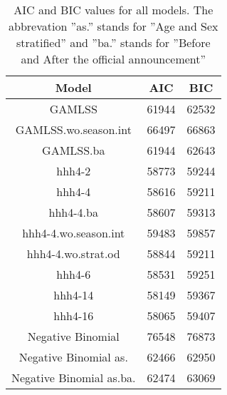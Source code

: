 \begin{table}[ht]
\centering
\begin{tabular}{ccc}
  \hline
Model & AIC & BIC \\ 
  \hline
GAMLSS & 61944 & 62532 \\ 
  GAMLSS.wo.season.int & 66497 & 66863 \\ 
  GAMLSS.ba & 61944 & 62643 \\ 
  hhh4-2 & 58773 & 59244 \\ 
  hhh4-4 & 58616 & 59211 \\ 
  hhh4-4.ba & 58607 & 59313 \\ 
  hhh4-4.wo.season.int & 59483 & 59857 \\ 
  hhh4-4.wo.strat.od & 58844 & 59211 \\ 
  hhh4-6 & 58531 & 59251 \\ 
  hhh4-14 & 58149 & 59367 \\ 
  hhh4-16 & 58065 & 59407 \\ 
  Negative Binomial  & 76548 & 76873 \\ 
  Negative Binomial as. & 62466 & 62950 \\ 
  Negative Binomial as.ba. & 62474 & 63069 \\ 
   \hline
\end{tabular}
\caption{AIC and BIC values for all models.
    The abbrevation ''as.'' stands for ''Age and Sex stratified'' and ''ba.''
    stands for ''Before and After the official announcement''} 
\label{TabelMods}
\end{table}
